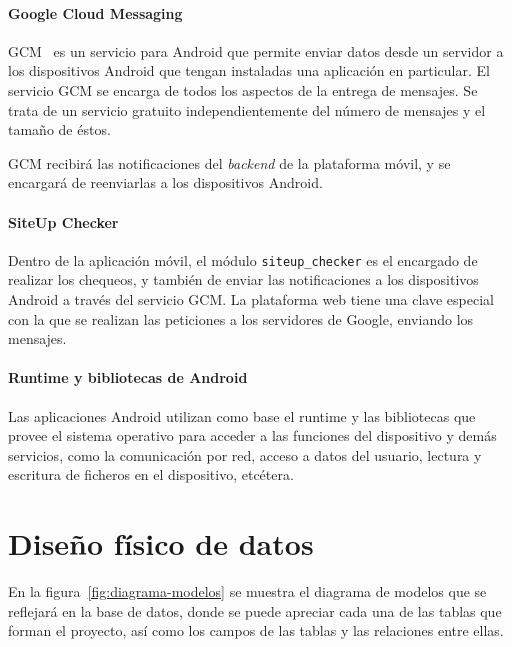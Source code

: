 \paragraph{Google Cloud Messaging}

GCM~\cite{gcm} es un servicio para Android que permite enviar datos desde un
servidor a los dispositivos Android que tengan instaladas una aplicación en
particular. El servicio GCM se encarga de todos los aspectos de la entrega de
mensajes. Se trata de un servicio gratuito independientemente del número de
mensajes y el tamaño de éstos.

GCM recibirá las notificaciones del \textit{backend} de la plataforma móvil, y
se encargará de reenviarlas a los dispositivos Android.

\paragraph{SiteUp Checker}

Dentro de la aplicación móvil, el módulo \texttt{siteup\_checker} es el
encargado de realizar los chequeos, y también de enviar las notificaciones a los
dispositivos Android a través del servicio GCM. La plataforma web tiene una
clave especial con la que se realizan las peticiones a los servidores de Google,
enviando los mensajes.

\paragraph{Runtime y bibliotecas de Android}

Las aplicaciones Android utilizan como base el runtime y las bibliotecas que
provee el sistema operativo para acceder a las funciones del dispositivo y demás
servicios, como la comunicación por red, acceso a datos del usuario, lectura y
escritura de ficheros en el dispositivo, etcétera.


\section{Diseño físico de datos}

En la figura~\ref{fig:diagrama-modelos} se muestra el diagrama de modelos que se
reflejará en la base de datos, donde se puede apreciar cada una de las tablas
que forman el proyecto, así como los campos de las tablas y las relaciones entre
ellas.

